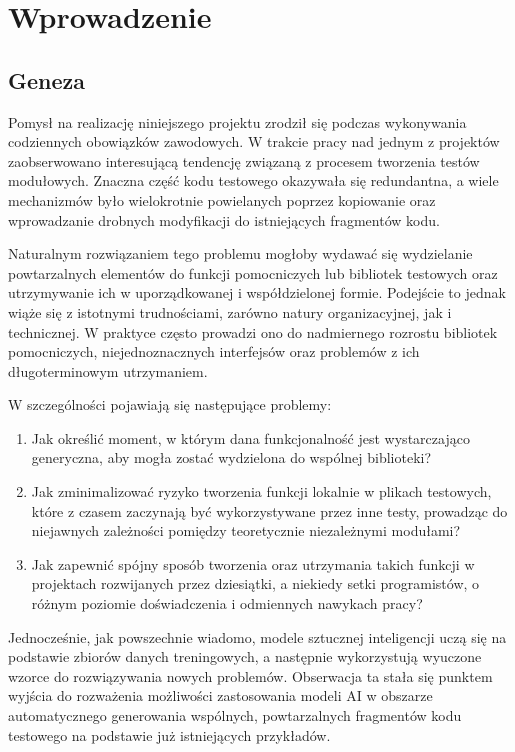 \section{Wprowadzenie}
\label{sec:Wprowadzenie}

\subsection{Geneza}

Pomysł na realizację niniejszego projektu zrodził się podczas wykonywania codziennych obowiązków zawodowych. W trakcie pracy nad jednym z projektów zaobserwowano interesującą tendencję związaną z procesem tworzenia testów modułowych. Znaczna część kodu testowego okazywała się redundantna, a wiele mechanizmów było wielokrotnie powielanych poprzez kopiowanie oraz wprowadzanie drobnych modyfikacji do istniejących fragmentów kodu.

Naturalnym rozwiązaniem tego problemu mogłoby wydawać się wydzielanie powtarzalnych elementów do funkcji pomocniczych lub bibliotek testowych oraz utrzymywanie ich w uporządkowanej i współdzielonej formie. Podejście to jednak wiąże się z istotnymi trudnościami, zarówno natury organizacyjnej, jak i technicznej. W praktyce często prowadzi ono do nadmiernego rozrostu bibliotek pomocniczych, niejednoznacznych interfejsów oraz problemów z ich długoterminowym utrzymaniem.

W szczególności pojawiają się następujące problemy:
\begin{enumerate}
  \item Jak określić moment, w którym dana funkcjonalność jest wystarczająco generyczna, aby mogła zostać wydzielona do wspólnej biblioteki?
  \item Jak zminimalizować ryzyko tworzenia funkcji lokalnie w plikach testowych, które z czasem zaczynają być wykorzystywane przez inne testy, prowadząc do niejawnych zależności pomiędzy teoretycznie niezależnymi modułami?
  \item Jak zapewnić spójny sposób tworzenia oraz utrzymania takich funkcji w projektach rozwijanych przez dziesiątki, a niekiedy setki programistów, o różnym poziomie doświadczenia i odmiennych nawykach pracy?
\end{enumerate}

Jednocześnie, jak powszechnie wiadomo, modele sztucznej inteligencji uczą się na podstawie zbiorów danych treningowych, a następnie wykorzystują wyuczone wzorce do rozwiązywania nowych problemów. Obserwacja ta stała się punktem wyjścia do rozważenia możliwości zastosowania modeli AI w obszarze automatycznego generowania wspólnych, powtarzalnych fragmentów kodu testowego na podstawie już istniejących przykładów.

